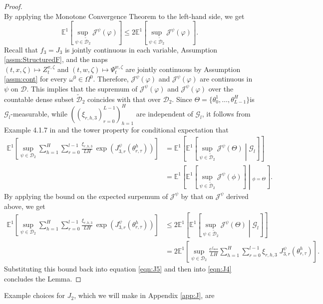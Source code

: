 \documentclass{article}
\newcommand{\E}{\mathbb{E}}
\begin{document}
\begin{appendices}
\begin{proof}
\[\]
By applying the Monotone Convergence Theorem to the left-hand side, we get
\[
\E^1\left[\sup_{\psi\in \widetilde{\mathscr{D}}_2}\mathcal J^{\psi}(\varphi)\right]\le2 \E^1\left[\sup_{\psi\in \widetilde{\mathscr{D}}_2}\mathscr J^{\psi}(\varphi)\right].
\]
Recall that $f_3=J_3$ is jointly continuous in each variable, Assumption \ref{assm:StructuredF}, and the maps \\$(t,x,\zeta)\mapsto Z_t^{x,\zeta}$ and $(t,w,\zeta)\mapsto \Psi_t^{w,\zeta}$ are jointly continuous by Assumption \ref{assm:cont} for every $\omega^0\in \Omega^0$. Therefore, $\mathcal J^{\psi}(\varphi)$ and $\mathscr J^{\psi}(\varphi)$ are continuous in $\psi$ on $\mathscr{D}$. This implies that the supremum of $\mathcal J^{\psi}(\varphi)$ and $\mathscr J^{\psi}(\varphi)$ over the countable dense subset $\widetilde{\mathscr D}_2$ coincides with that over $\mathscr{D}_2$. Since $\Theta =\{\theta_{0}^1,\ldots,\theta^H_{L-1} \}$is $\mathcal G_l$-measurable, while $((\xi_{r,h,3})_{r=0}^{L-1})_{h=1}^H$ are independent of $\mathcal G_l$, it follows from Example 4.1.7 in \cite{Durrett_2019} and the tower property for conditional expectation that
\begin{align*}
    \mathbb E^1\left[\sup_{\psi \in \mathscr D_2}\sum_{h=1}^H\sum_{r=0}^{l-1}\frac{\xi_{r,h,3}}{LH}\,\exp\left( J^{\psi}_{3,r}(\theta^h_{r,\tau})\right)\right]&= \E^1\left[\E^1\left[\sup_{\psi\in \widetilde{\mathscr{D}}_2}\mathcal J^\psi(\Theta)\middle|\mathcal G_l\right]\right]\\
    &= \E^1\left[\E^1\left[\sup_{\psi\in \widetilde{\mathscr{D}}_2}\mathcal J^\psi(\phi)\right]\middle|_{\phi=\Theta}\right].
\end{align*}
By applying the bound on the expected surpemum of $\mathcal J^\psi$ by that on $\mathscr{J}^\psi$ derived above, we get
\begin{align*}
    \mathbb E^1\left[\sup_{\psi \in \mathscr D_2}\sum_{h=1}^H\sum_{r=0}^{l-1}\frac{\xi_{r,h,3}}{LH}\,\exp\left( J^{\psi}_{3,r}(\theta^h_{r,\tau})\right)\right]&\le 2\E^1\left[\E^1\left[\sup_{\psi\in \widetilde{\mathscr{D}}_2}\mathscr J^\psi(\Theta)\middle|\mathcal G_l\right]\right]
    \\&=2 \mathbb E^1\left[\sup_{\psi \in \mathscr D_2}\frac{e^{f_{\mathrm{max}}}}{LH}\sum_{h=1}^H\sum_{r=0}^{l-1}\xi_{r,h,3}\;  J^{\psi}_{3,r}(\theta^h_{r,\tau})\right].
\end{align*}
Substituting this bound back into equation \eqref{eqn:J5} and then into \eqref{eqn:J4} concludes the Lemma.
\end{proof}
Example choices for $J_2$, which we will make in Appendix \ref{app:J}, are

\end{appendices}
\end{document}
